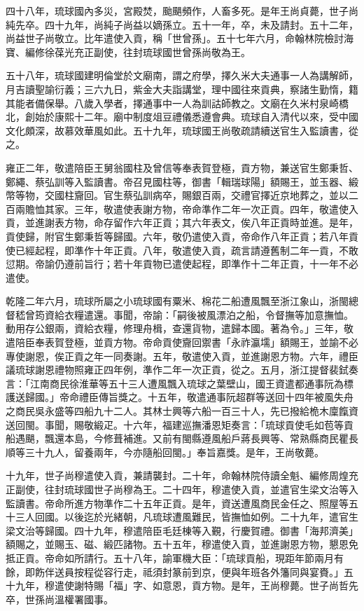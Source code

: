 \begin{pinyinscope}
四十八年，琉球國內多災，宮殿焚，颱颶頻作，人畜多死。是年王尚貞薨，世子尚純先卒。四十九年，尚純子尚益以嫡孫立。五十一年，卒，未及請封。五十二年，尚益世子尚敬立。比年遣使入貢，稱「世曾孫」。五十七年六月，命翰林院檢討海寶、編修徐葆光充正副使，往封琉球國世曾孫尚敬為王。

五十八年，琉球國建明倫堂於文廟南，謂之府學，擇久米大夫通事一人為講解師，月吉讀聖諭衍義；三六九日，紫金大夫詣講堂，理中國往來貢典，察諸生勤惰，籍其能者備保舉。八歲入學者，擇通事中一人為訓詁師教之。文廟在久米村泉崎橋北，創始於康熙十二年。廟中制度俎豆禮儀悉遵會典。琉球自入清代以來，受中國文化頗深，故慕效華風如此。五十九年，琉球國王尚敬疏請續送官生入監讀書，從之。

雍正二年，敬遣陪臣王舅翁國柱及曾信等奉表賀登極，貢方物，兼送官生鄭秉哲、鄭繩、蔡弘訓等入監讀書。帝召見國柱等，御書「輯瑞球陽」額賜王，並玉器、緞幣等物，交國柱齎回。官生蔡弘訓病卒，賜銀百兩，交禮官擇近京地葬之，並以二百兩贍恤其家。三年，敬遣使表謝方物，帝命準作二年一次正貢。四年，敬遣使入貢，並進謝表方物，命存留作六年正貢；其六年表文，俟八年正貢時並進。是年，貢使歸，附官生鄭秉哲等歸國。六年，敬仍遣使入貢，帝命作八年正貢；若八年貢使已經起程，即準作十年正貢。八年，敬遣使入貢，疏言請遵舊制二年一貢，不敢愆期。帝諭仍遵前旨行；若十年貢物已遣使起程，即準作十二年正貢，十一年不必遣使。

乾隆二年六月，琉球所屬之小琉球國有粟米、棉花二船遭風飄至浙江象山，浙閩總督嵇曾筠資給衣糧遣還。事聞，帝諭：「嗣後被風漂泊之船，令督撫等加意撫恤。動用存公銀兩，資給衣糧，修理舟楫，查還貨物，遣歸本國。著為令。」三年，敬遣陪臣奉表賀登極，並貢方物。帝命貢使齎回禦書「永祚瀛壖」額賜王，並諭不必專使謝恩，俟正貢之年一同奏謝。五年，敬遣使入貢，並進謝恩方物。六年，禮臣議琉球謝恩禮物照雍正四年例，準作二年一次正貢，從之。五月，浙江提督裴鉽奏言：「江南商民徐淮華等五十三人遭風飄入琉球之葉壁山，國王資遣都通事阮為標護送歸國。」帝命禮臣傳旨獎之。十五年，敬遣通事阮超群等送回十四年被風失舟之商民吳永盛等四船九十二人。其林士興等六船一百三十人，先已撥給桅木廩餼資送回閩。事聞，賜敬緞疋。十六年，福建巡撫潘恩矩奏言：「琉球貢使毛如苞等貢船遇颶，飄還本島，今修葺補進。又前有閩縣遵風船戶蔣長興等、常熟縣商民瞿長順等三十九人，留養兩年，今亦隨船回閩。」奉旨嘉獎。是年，王尚敬薨。

十九年，世子尚穆遣使入貢，兼請襲封。二十年，命翰林院侍讀全魁、編修周煌充正副使，往封琉球國世子尚穆為王。二十四年，穆遣使入貢，並遣官生梁文治等入監讀書。帝命所進方物準作二十五年正貢。是年，資送遭風商民金任之、照屋等五十三人回國。以後迄於光緒朝，凡琉球遭風難民，皆撫恤如例。二十九年，遣官生梁文治等歸國。四十九年，穆遣陪臣毛廷棟等入覲，行慶賀禮。御書「海邦濟美」額賜之，並賜玉、磁、緞匹諸物。五十五年，穆遣使入貢，並進謝恩方物，懇恩免抵正貢。帝命如所請行。五十八年，諭軍機大臣：「琉球貢船，現距年節兩月有餘，即飭伴送員按程從容行走，祗須封篆前到京，便與年班各外籓同與宴賚。」五十九年，穆遣使謝特賜「福」字、如意恩，貢方物。是年，王尚穆薨。世子尚哲先卒，世孫尚溫權署國事。


\end{pinyinscope}
